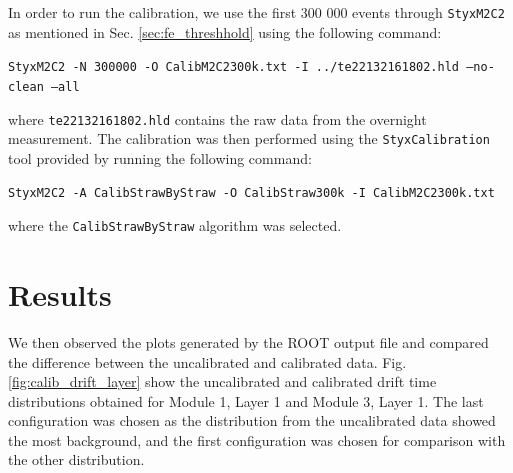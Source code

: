 \documentclass[a4paper]{report}
\numberwithin{equation}{section}
\begin{document}
In order to run the calibration, we use the first 300 000 events through \texttt{StyxM2C2} as mentioned in 
Sec. \ref{sec:fe_threshhold} using the following command:
\begin{tcolorbox}
	\texttt{StyxM2C2 -N 300000 -O CalibM2C2300k.txt -I ../te22132161802.hld --no-clean --all}
\end{tcolorbox}
where \texttt{te22132161802.hld} contains the raw data from the overnight measurement. The calibration was then performed using the \texttt{StyxCalibration} 
tool provided by running the following command:
\begin{tcolorbox}
	\texttt{StyxM2C2 -A CalibStrawByStraw -O CalibStraw300k -I CalibM2C2300k.txt}
\end{tcolorbox}
where the \texttt{CalibStrawByStraw} algorithm was selected. 

\section{Results} \label{sec:calib_results}

We then observed the plots generated by the ROOT output file and compared the difference between the uncalibrated and 
calibrated data. Fig. \ref{fig:calib_drift_layer} show the uncalibrated and calibrated drift time distributions obtained for Module 1, Layer 1 and 
Module 3, Layer 1. The last configuration was chosen as the distribution from the uncalibrated data showed the most background, and the first 
configuration was chosen for comparison with the other distribution. \par
\end{document}
